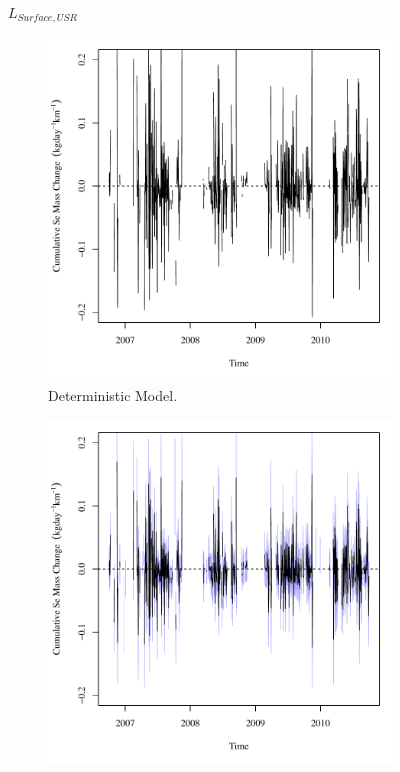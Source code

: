 \subfiguretop
\begin{landscape}
	\begin{figure}
		$ \displaystyle L_{Surface,USR} $
		\begin{subfigure}{0.7\textwidth}
			\centering
			\includegraphics[width=\tableCustomSize]{"Figures/Results_USR/Deterministic/Balance Mass - Storage"}
			\caption{Deterministic Model.}
		\end{subfigure}%
		\begin{subfigure}{0.7\textwidth}
			\centering
			\includegraphics[width=\tableCustomSize]{"Figures/Results_USR/Stochastic/Balance Mass - Storage"}

\end{subfigure}
\end{figure}
\end{landscape}
